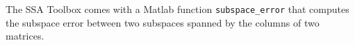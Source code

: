 \documentclass{article}
\newcommand{\1}{\ensuremath{\mathds{1}}}
\newcommand{\0}{\ensuremath{0}}
\begin{document}
\begin{appendices}
The SSA Toolbox comes with a Matlab function \texttt{subspace\_error} that computes the subspace
error between two subspaces spanned by the columns of two matrices. 

\end{appendices}


\newpage


\end{document}
